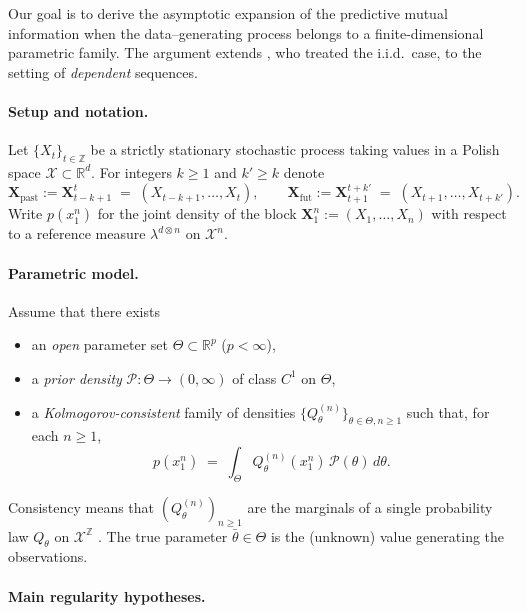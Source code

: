 \documentclass{article}
\begin{document}
Our goal is to derive the asymptotic expansion of the predictive mutual
information when the data–generating process belongs to a finite-dimensional
parametric family.  The argument extends \citet{bialek1999predictive}, who
treated the i.i.d.\ case, to the setting of \emph{dependent} sequences.

\paragraph{Setup and notation.}
Let $\{X_t\}_{t\in\mathbb Z}$ be a strictly stationary stochastic process
taking values in a Polish space $\mathcal X\subset\mathbb R^{d}$.  For
integers $k\ge 1$ and $k'\ge k$ denote
\[
  \mathbf X_{\mathrm{past}}
    := \mathbf X_{t-k+1}^{t}
    \;=\;(X_{t-k+1},\dots,X_{t}),
  \qquad
  \mathbf X_{\mathrm{fut}}
    := \mathbf X_{t+1}^{t+k'}
    \;=\;(X_{t+1},\dots,X_{t+k'}).
\]
Write $p(x_{1}^{n})$ for the joint density of the block
$\mathbf X_{1}^{n}:=(X_{1},\dots,X_{n})$ with respect to a reference measure
$\lambda^{d\otimes n}$ on $\mathcal X^{n}$.

\paragraph{Parametric model.}
Assume that there exists
\begin{itemize}
  \item an \emph{open} parameter set $\Theta\subset\mathbb R^{p}$ ($p<\infty$),
  \item a \emph{prior density} $\mathcal P\colon\Theta\to(0,\infty)$ of class
        $C^{1}$ on $\Theta$,
  \item a \emph{Kolmogorov-consistent} family of densities
        $\bigl\{Q^{(n)}_\theta\bigr\}_{\theta\in\Theta,n\ge 1}$ such that, for
        each $n\ge 1$,
        \[
            p(x_{1}^{n})
            \;=\;
            \int_{\Theta}
              Q^{(n)}_\theta(x_{1}^{n})\,
              \mathcal P(\theta)\,d\theta.
        \]
\end{itemize}
Consistency means that $(Q^{(n)}_\theta)_{n\ge 1}$ are the marginals of a
single probability law $Q_\theta$ on $\mathcal X^{\mathbb Z}$
\citep[Chap.\,8]{kallenberg2002foundations}.  The true parameter
$\bar\theta\in\Theta$ is the (unknown) value generating the observations.

\paragraph{Main regularity hypotheses.}
\end{document}
